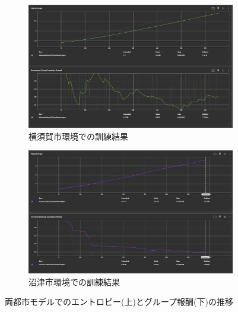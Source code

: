 \begin{figure}[H]
  \centering
  \begin{subfigure}{0.45\textwidth}
      \centering
      \includegraphics[width=\textwidth]{Figures/YokosukaSearch-ModelResult1.png}
      \caption{横須賀市環境での訓練結果}
      \label{fig:YokosukaModel-Search-Result}
  \end{subfigure}
  \begin{subfigure}{0.45\textwidth}
      \centering
      \includegraphics[width=\textwidth]{Figures/NumazuSearch-ModelResult1.png}
      \caption{沼津市環境での訓練結果}
      \label{fig:NumazuModel-Search-Result}
  \end{subfigure}
  \caption{両都市モデルでのエントロピー(上)とグループ報酬(下)の推移}
  \label{fig:SearchModel-Result1}
\end{figure}
